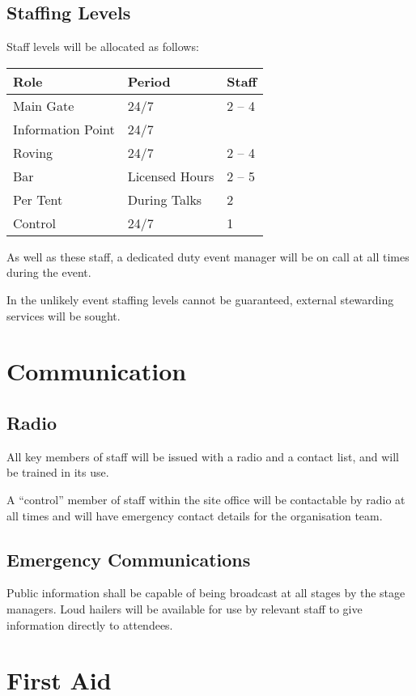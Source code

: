 \subsection{Staffing Levels}

Staff levels will be allocated as follows:

\begin{tabular}{l l l}
Role & Period & Staff \\
\hline
Main Gate & 24/7 & 2 -- 4 \\
Information Point & 24/7 & \\
Roving & 24/7 & 2 -- 4 \\
Bar & Licensed Hours & 2 -- 5 \\
Per Tent & During Talks & 2 \\
Control & 24/7 & 1
\end{tabular}

As well as these staff, a dedicated duty event manager will be on call at all times during the event.

In the unlikely event staffing levels cannot be guaranteed, external stewarding services will be sought.

\section{Communication}

\subsection{Radio}
All key members of staff will be issued with a radio and a contact list, and will be trained in its use.

A ``control'' member of staff within the site office will be contactable by radio at all times and will
have emergency contact details for the organisation team.

\subsection{Emergency Communications}
Public information shall be capable of being broadcast at all stages by the stage managers. Loud hailers will
be available for use by relevant staff to give information directly to attendees.


\section{First Aid}

